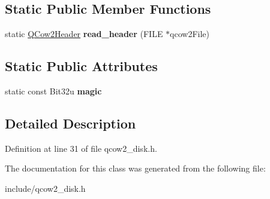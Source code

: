 \subsection*{Static Public Member Functions}
\begin{DoxyCompactItemize}
\item 
\hypertarget{classQCow2Image_a4a2b27e7775d5a10653f1ea292e28712}{static \hyperlink{structQCow2Image_1_1QCow2Header}{Q\-Cow2\-Header} {\bfseries read\-\_\-header} (F\-I\-L\-E $\ast$qcow2\-File)}\label{classQCow2Image_a4a2b27e7775d5a10653f1ea292e28712}

\end{DoxyCompactItemize}
\subsection*{Static Public Attributes}
\begin{DoxyCompactItemize}
\item 
\hypertarget{classQCow2Image_ab13614f8e9a644877a2424665cfea9de}{static const Bit32u {\bfseries magic}}\label{classQCow2Image_ab13614f8e9a644877a2424665cfea9de}

\end{DoxyCompactItemize}


\subsection{Detailed Description}


Definition at line 31 of file qcow2\-\_\-disk.\-h.



The documentation for this class was generated from the following file\-:\begin{DoxyCompactItemize}
\item 
include/qcow2\-\_\-disk.\-h\end{DoxyCompactItemize}
